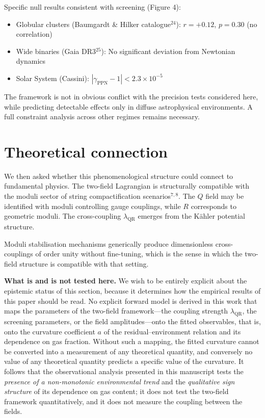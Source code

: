 \documentclass[11pt,a4paper]{article}
\begin{document}
Specific null results consistent with screening (Figure 4):
\begin{itemize}
\item Globular clusters (Baumgardt \& Hilker catalogue$^{24}$): $r = +0.12$, $p = 0.30$ (no correlation)
\item Wide binaries (Gaia DR3$^{25}$): No significant deviation from Newtonian dynamics
\item Solar System (Cassini): $|\gamma_{\mathrm{PPN}} - 1| < 2.3 \times 10^{-5}$
\end{itemize}

The framework is not in obvious conflict with the precision tests considered here, while predicting detectable effects only in diffuse astrophysical environments. A full constraint analysis across other regimes remains necessary.


\section*{Theoretical connection}

We then asked whether this phenomenological structure could connect to fundamental physics. The two-field Lagrangian is structurally compatible with the moduli sector of string compactification scenarios$^{7,8}$. The $Q$ field may be identified with moduli controlling gauge couplings, while $R$ corresponds to geometric moduli. The cross-coupling $\lambda_{\mathrm{QR}}$ emerges from the K\"ahler potential structure.

Moduli stabilisation mechanisms generically produce dimensionless cross-couplings of order unity without fine-tuning, which is the sense in which the two-field structure is compatible with that setting.

\textbf{What is and is not tested here.} We wish to be entirely explicit about the epistemic status of this section, because it determines how the empirical results of this paper should be read. No explicit forward model is derived in this work that maps the parameters of the two-field framework---the coupling strength $\lambda_{\mathrm{QR}}$, the screening parameters, or the field amplitudes---onto the fitted observables, that is, onto the curvature coefficient $a$ of the residual--environment relation and its dependence on gas fraction. Without such a mapping, the fitted curvature cannot be converted into a measurement of any theoretical quantity, and conversely no value of any theoretical quantity predicts a specific value of the curvature. It follows that the observational analysis presented in this manuscript tests the \textit{presence of a non-monotonic environmental trend} and the \textit{qualitative sign structure} of its dependence on gas content; it does not test the two-field framework quantitatively, and it does not measure the coupling between the fields.
\end{document}
